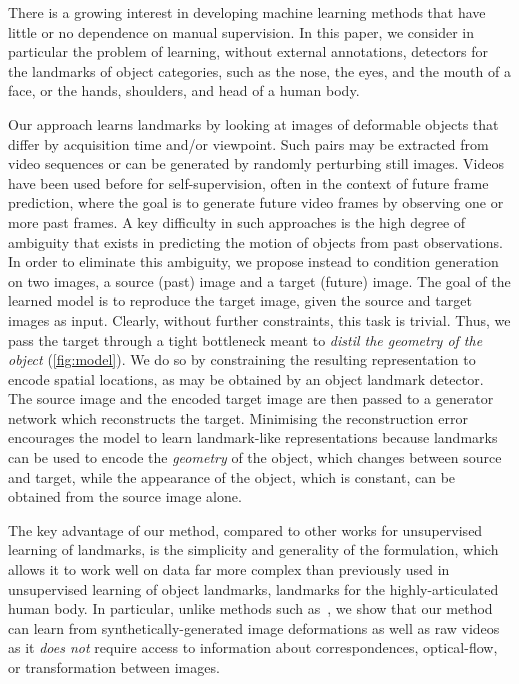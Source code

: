 \documentclass{article}
\begin{document}
There is a growing interest in developing machine learning methods that have little or no dependence on manual supervision. In this paper, we consider in particular the problem of learning, without external annotations, detectors for the landmarks of object categories, such as the nose, the eyes, and the mouth of a face, or the hands, shoulders, and head of a human body.


Our approach learns landmarks by looking at images of deformable objects that differ by acquisition time and/or viewpoint. Such pairs may be extracted from video sequences or can be generated by randomly perturbing still images. Videos have been used before for self-supervision, often in the context of future frame prediction, where the goal is to generate future video frames by observing one or more past frames. A key difficulty in such approaches is the high degree of ambiguity that exists in predicting the motion of objects from past observations. In order to eliminate this ambiguity, we propose instead to condition generation on two images, a source (past) image and a target (future) image. The goal of the learned model is to reproduce the target image, given the source and target images as input. Clearly, without further constraints, this task is trivial. Thus, we pass the target through a tight bottleneck meant to \emph{distil the geometry of the object} (\cref{fig:model}). We do so by constraining the resulting representation to encode spatial locations, as may be obtained by an object landmark detector. The source image and the encoded target image are then passed to a generator network which reconstructs the target. Minimising the reconstruction error encourages the model to learn landmark-like representations because landmarks can be used to encode the \emph{geometry} of the object, which changes between source and target, while the appearance of the object, which is constant, can be obtained from the source image alone.


The key advantage of our method, compared to other works for unsupervised learning of landmarks, is the simplicity and generality of the formulation, which allows it to work well on data far more complex than previously used in unsupervised learning of object landmarks, \eg landmarks for the highly-articulated human body.
In particular, unlike methods such as~\cite{thewlis17unsupervised,thewlis17Bunsupervised,zhang2018unsupervised}, we show that our method can learn from synthetically-generated image deformations as well as raw videos as it \emph{does not} require access to information about correspondences, optical-flow, or transformation between images.
\end{document}

